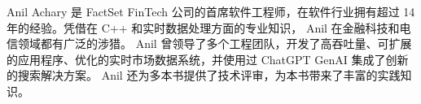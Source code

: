 Anil Achary 是 FactSet FinTech 公司的首席软件工程师，在软件行业拥有超过 14 年的经验。凭借在 C++ 和实时数据处理方面的专业知识， Anil 在金融科技和电信领域都有广泛的涉猎。 Anil 曾领导了多个工程团队，开发了高吞吐量、可扩展的应用程序、优化的实时市场数据系统，并使用过 ChatGPT GenAI 集成了创新的搜索解决方案。 Anil 还为多本书提供了技术评审，为本书带来了丰富的实践知识。
